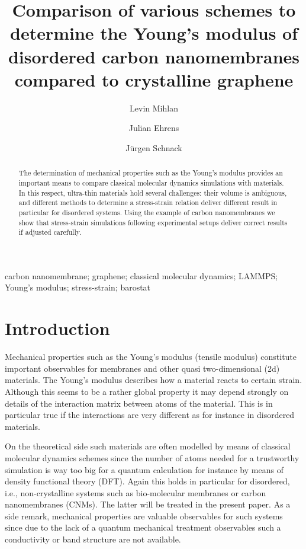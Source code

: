 \documentclass[preprint,12pt]{elsarticle}
\begin{document}
\begin{frontmatter}

\title{Comparison of various schemes to determine the Young's modulus of 
disordered carbon nanomembranes compared to crystalline graphene}
\author{Levin Mihlan}
\author{Julian Ehrens}
\author{J{\"u}rgen Schnack}
\address[bi]{Dept. of Physics, Bielefeld University, P.O. box
  100131, D-33501 Bielefeld, Germany}

\begin{abstract}
The determination of mechanical properties such as the Young's modulus
provides an important means to compare classical molecular dynamics simulations
with materials. In this respect, ultra-thin materials hold several challenges:
their volume is ambiguous, and different methods to determine a stress-strain 
relation deliver different result in particular for disordered systems. 
Using the example of carbon nanomembranes we show that 
stress-strain simulations following experimental setups 
deliver correct results if adjusted carefully.
\end{abstract}

\begin{keyword}
carbon nanomembrane; graphene; classical molecular dynamics; LAMMPS; Young's modulus; stress-strain; barostat
\end{keyword}

\end{frontmatter}


\section{Introduction}
\label{sec-1}

Mechanical properties such as the Young's modulus (tensile modulus) constitute important observables 
for membranes and other quasi two-di\-men\-sional (2d) materials. The Young's modulus describes 
how a material reacts to certain strain. Although this seems to be a rather global
property it may depend strongly on details of the interaction matrix between atoms of
the material. This is in particular true if the interactions are very different as 
for instance in disordered materials. 

On the theoretical side such materials are often modelled by means of classical 
molecular dynamics schemes since the number of atoms needed for a trustworthy simulation
is way too big for a quantum calculation for instance by means of density functional
theory (DFT). Again this holds in particular for disordered, i.e., non-crystalline systems such as 
bio-molecular membranes or carbon nanomembranes (CNMs). The latter will be treated in the
present paper. As a side remark, mechanical properties are valuable observables for
such systems since due to the lack of a quantum mechanical treatment observables 
such a conductivity or band structure are not available.
\end{document}
